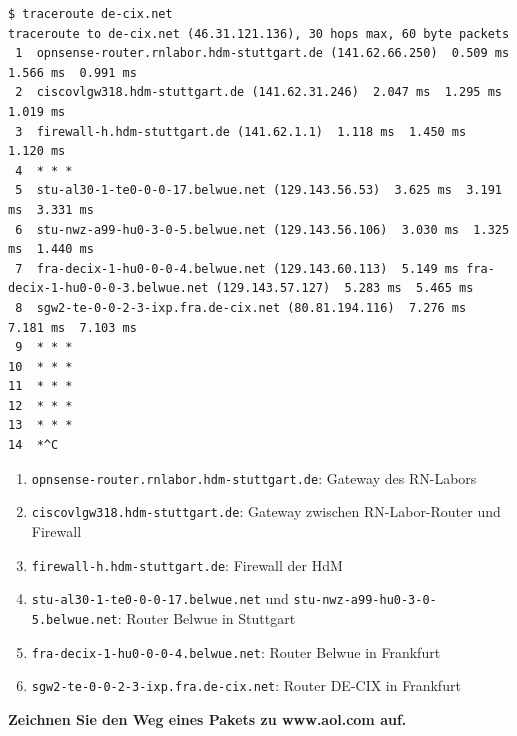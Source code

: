 \begin{verbatim}
$ traceroute de-cix.net
traceroute to de-cix.net (46.31.121.136), 30 hops max, 60 byte packets
 1  opnsense-router.rnlabor.hdm-stuttgart.de (141.62.66.250)  0.509 ms  1.566 ms  0.991 ms
 2  ciscovlgw318.hdm-stuttgart.de (141.62.31.246)  2.047 ms  1.295 ms  1.019 ms
 3  firewall-h.hdm-stuttgart.de (141.62.1.1)  1.118 ms  1.450 ms  1.120 ms
 4  * * *
 5  stu-al30-1-te0-0-0-17.belwue.net (129.143.56.53)  3.625 ms  3.191 ms  3.331 ms
 6  stu-nwz-a99-hu0-3-0-5.belwue.net (129.143.56.106)  3.030 ms  1.325 ms  1.440 ms
 7  fra-decix-1-hu0-0-0-4.belwue.net (129.143.60.113)  5.149 ms fra-decix-1-hu0-0-0-3.belwue.net (129.143.57.127)  5.283 ms  5.465 ms
 8  sgw2-te-0-0-2-3-ixp.fra.de-cix.net (80.81.194.116)  7.276 ms  7.181 ms  7.103 ms
 9  * * *
10  * * *
11  * * *
12  * * *
13  * * *
14  *^C
\end{verbatim}

\begin{enumerate}
\def\labelenumi{\arabic{enumi}.}
\tightlist
\item
  \texttt{opnsense-router.rnlabor.hdm-stuttgart.de}: Gateway des
  RN-Labors
\item
  \texttt{ciscovlgw318.hdm-stuttgart.de}: Gateway zwischen
  RN-Labor-Router und Firewall
\item
  \texttt{firewall-h.hdm-stuttgart.de}: Firewall der HdM
\item
  \texttt{stu-al30-1-te0-0-0-17.belwue.net} und
  \texttt{stu-nwz-a99-hu0-3-0-5.belwue.net}: Router Belwue in Stuttgart
\item
  \texttt{fra-decix-1-hu0-0-0-4.belwue.net}: Router Belwue in Frankfurt
\item
  \texttt{sgw2-te-0-0-2-3-ixp.fra.de-cix.net}: Router DE-CIX in
  Frankfurt
\end{enumerate}

\textbf{Zeichnen Sie den Weg eines Pakets zu www.aol.com auf.}

